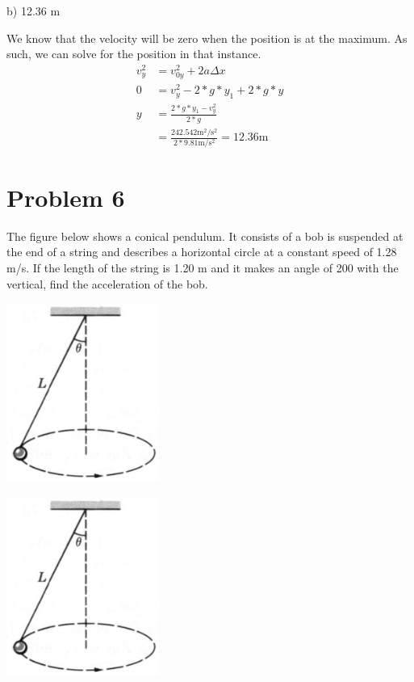\documentclass[12pt]{article}
\begin{document}
b) 12.36 m

We know that the velocity will be zero when the position is at the maximum. As such, we can solve for the position in that instance.
\begin{align}
    v_y^2 &= v_{0y}^2 + 2a\Delta x\\
    0 &= v_y^2 - 2*g*y_1 + 2*g*y\\
    y &= \frac{2*g*y_1 - v_y^2}{2*g}\\
        &= \frac{242.542 \unit{\meter^2/\second^2}}{2*9.81 \unit{\meter/\second^2}} = \boxed{ 12.36 \unit{\meter} }
\end{align}

\pagebreak
\section*{Problem 6}
The figure below shows a conical pendulum. It consists of a bob is suspended at the end of a
string and describes a horizontal circle at a constant speed of 1.28 m/s. If the length of the
string is 1.20 m and it makes an angle of 200 with the vertical, find the acceleration of the bob.

\begin{center}
    \includegraphics*[width=5cm]{graph_6.png}
\end{center}
\begin{center}
    \includegraphics*[width=5cm]{graph_6.png}
\end{center}
\end{document}
